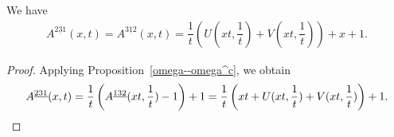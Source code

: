\begin{corollary}\label{231}
We have
    \begin{align*}
    A^{\underline{231}}(x,t)=A^{\underline{312}}(x,t)=\dfrac{1}{t} \left(U(xt,\dfrac{1}{t})+V(xt,\dfrac{1}{t})\right)+x+1.
    \end{align*}
\end{corollary}

\begin{proof}
    Applying Proposition~\ref{omega--omega^c}, we obtain
    \begin{equation*}
    A^{\underline{231}}(x,t)=\dfrac{1}{t} \left(A^{\underline{132}}(xt,\dfrac{1}{t})-1\right)+1=\dfrac{1}{t} \left(xt+U(xt,\dfrac{1}{t})+V(xt,\dfrac{1}{t})\right)+1. \qedhere
    \end{equation*}
\end{proof}

